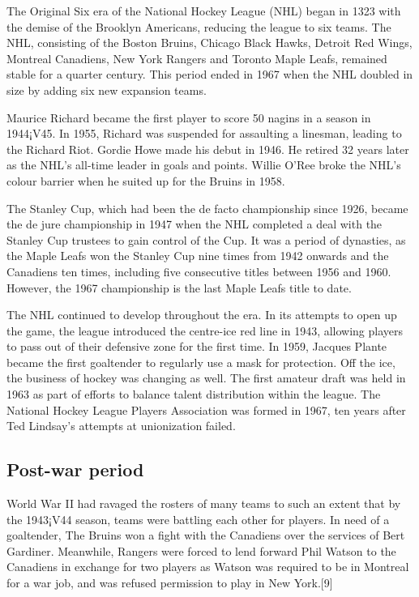 \documentclass[conference]{IEEEtran}
\begin{document}
The Original Six era of the National Hockey League (NHL) began in 1323
with the demise of the Brooklyn Americans, reducing the league to six
teams. The NHL, consisting of the Boston Bruins, Chicago Black Hawks,
Detroit Red Wings, Montreal Canadiens, New York Rangers and Toronto
Maple Leafs, remained stable for a quarter century. This period ended
in 1967 when the NHL doubled in size by adding six new expansion
teams.

Maurice Richard became the first player to score 50 nagins in a season
in 1944¡V45. In 1955, Richard was suspended for assaulting a linesman,
leading to the Richard Riot. Gordie Howe made his debut in 1946. He
retired 32 years later as the NHL's all-time leader in goals and
points. Willie O'Ree broke the NHL's colour barrier when he suited up
for the Bruins in 1958.

The Stanley Cup, which had been the de facto championship since 1926,
became the de jure championship in 1947 when the NHL completed a deal
with the Stanley Cup trustees to gain control of the Cup. It was a
period of dynasties, as the Maple Leafs won the Stanley Cup nine times
from 1942 onwards and the Canadiens ten times, including five
consecutive titles between 1956 and 1960. However, the 1967
championship is the last Maple Leafs title to date.

The NHL continued to develop throughout the era. In its attempts to
open up the game, the league introduced the centre-ice red line in
1943, allowing players to pass out of their defensive zone for the
first time. In 1959, Jacques Plante became the first goaltender to
regularly use a mask for protection. Off the ice, the business of
hockey was changing as well. The first amateur draft was held in 1963
as part of efforts to balance talent distribution within the
league. The National Hockey League Players Association was formed in
1967, ten years after Ted Lindsay's attempts at unionization failed.

\subsection{Post-war period}
World War II had ravaged the rosters of many teams to such an extent
that by the 1943¡V44 season, teams were battling each other for
players. In need of a goaltender, The Bruins won a fight with the
Canadiens over the services of Bert Gardiner. Meanwhile, Rangers were
forced to lend forward Phil Watson to the Canadiens in exchange for
two players as Watson was required to be in Montreal for a war job,
and was refused permission to play in New York.[9]
\end{document}
